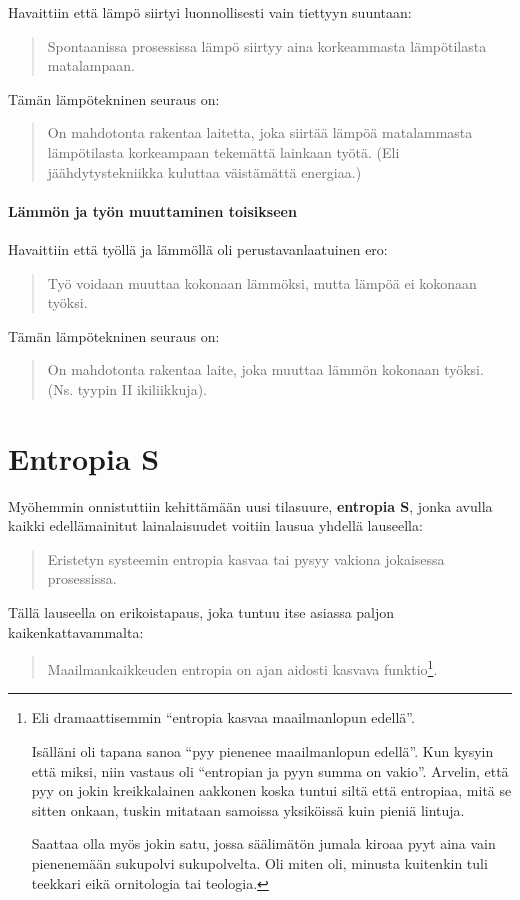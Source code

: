 \documentclass[12pt,a4paper,finnish]{book}
\begin{document}
Havaittiin että lämpö siirtyi luonnollisesti vain tiettyyn suuntaan:

\begin{quote}
 Spontaanissa prosessissa lämpö siirtyy aina korkeammasta lämpötilasta matalampaan.
\end{quote}

Tämän lämpötekninen seuraus on:

\begin{quote}
 On mahdotonta rakentaa laitetta, joka siirtää lämpöä matalammasta lämpötilasta korkeampaan tekemättä 
 lainkaan työtä. (Eli jäähdytystekniikka kuluttaa väistämättä energiaa.)
\end{quote}

\paragraph{Lämmön ja työn muuttaminen toisikseen}

Havaittiin että työllä ja lämmöllä oli perustavanlaatuinen ero:

\begin{quote}
 Työ voidaan muuttaa kokonaan lämmöksi, mutta lämpöä ei kokonaan työksi.
\end{quote}

Tämän lämpötekninen seuraus on:

\begin{quote}
 On mahdotonta rakentaa laite, joka muuttaa lämmön kokonaan työksi. (Ns. tyypin II ikiliikkuja).
\end{quote}

\section{Entropia S}

Myöhemmin onnistuttiin kehittämään uusi tilasuure, \textbf{entropia S}, jonka avulla kaikki
edellämainitut lainalaisuudet voitiin lausua yhdellä lauseella:

\begin{quote}
 Eristetyn systeemin entropia kasvaa tai pysyy vakiona jokaisessa prosessissa.
\end{quote}

Tällä lauseella on erikoistapaus, joka tuntuu itse asiassa paljon kaikenkattavammalta:

\begin{quote}
 Maailmankaikkeuden entropia on ajan aidosti kasvava funktio\footnote{Eli dramaattisemmin ``entropia 
 kasvaa maailmanlopun edellä''. 
 
 Isälläni oli tapana sanoa ``pyy pienenee maailmanlopun 
 edellä''. Kun kysyin että miksi, niin vastaus oli ``entropian ja pyyn summa on vakio''. Arvelin, että 
 pyy on jokin kreikkalainen aakkonen koska tuntui siltä että entropiaa, mitä se sitten onkaan, tuskin 
 mitataan samoissa yksiköissä kuin pieniä lintuja. 
 
 Saattaa olla myös jokin satu, jossa säälimätön jumala kiroaa pyyt aina vain pienenemään sukupolvi 
 sukupolvelta. Oli miten oli, minusta kuitenkin tuli teekkari eikä ornitologia tai teologia.}.
\end{quote}
\end{document}
